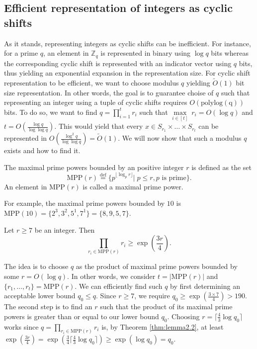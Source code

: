 \subsection*{Efficient representation of integers as cyclic shifts}
As it stands, representing integers as cyclic shifts can be inefficient. For instance, for a prime $q$, an element in $\mathbb{Z}_q$ is represented in binary using $\log q$ bits whereas the corresponding cyclic shift is represented with an indicator vector using $q$ bits, thus yielding an exponential expansion in the representation size. For cyclic shift representation to be efficient, we want to choose modulus $q$ yielding $\tilde{O}(1)$ bit size representation. In other words, the goal is to guarantee choise of $q$ such that representing an integer using a tuple of cyclic shifts requires $O(\operatorname{polylog(q)})$ bits. To do so, we want to find $q = \prod_{i=1}^t r_i$ such that $\underset{i \in [t]}{\max} \ r_i = O(\log q)$ and $t = O(\frac{\log q}{\log \log q})$. This would yield that every $x \in S_{r_1} \times \dots \times S_{r_t}$ can be represented in $O(\frac{\log^2q}{\log \log q}) = \tilde{O}(1)$. We will now show that such a modulus $q$ exists and how to find it.

\begin{definition}
    The maximal prime powers bounded by an positive integer $r$ is defined as the set
    \begin{equation*}
        \text{MPP}(r) \stackrel{\mathrm{def}}{=} \{p^{\lfloor \log_p r \rfloor} | \; p \leq r, p \text{ is prime}\}.
    \end{equation*}
    An element in $\text{MPP}(r)$ is called a maximal prime power.
\end{definition}
For example, the maximal prime powers bounded by $10$ is $\text{MPP}(10) = \{2^3, 3^2, 5^1, 7^1\} = \{8,9,5,7\}$.

\begin{theorem}\label{thm:lemma2.2}
    Let $r \geq 7$ be an integer. Then
    \begin{equation*}
        \underset{r_i \in \text{MPP}(r)}{\prod} r_i \geq \exp \left(\frac{3r}{4}\right).
    \end{equation*}
\end{theorem}

The idea is to choose $q$ as the product of maximal prime powers bounded by some $r = O(\log q)$. In other words, we consider $t = |\text{MPP}(r)|$ and $\{r_1, \dots, r_t\} = \text{MPP}(r)$. We can efficiently find such $q$ by first determining an acceptable lower bound $q_0 \leq q$. Since $r \geq 7$, we require $q_0 \geq \exp(\frac{3 \times 7}{4}) > 190$. The second step is to find an $r$ such that the product of its maximal prime powers is greater than or equal to our lower bound $q_0$. Choosing $r = \lceil \frac{4}{3} \log q_0 \rceil$ works since $q = \underset{r_i \in \text{MPP}(r)}{\prod} r_i$ is, by Theorem \ref{thm:lemma2.2}, at least $\exp \left(\frac{3r}{4}\right) = \exp \left( \frac{3}{4} \lceil \frac{4}{3} \log q_0 \rceil \right) \geq \exp \left( \log q_0 \right) = q_0$.

